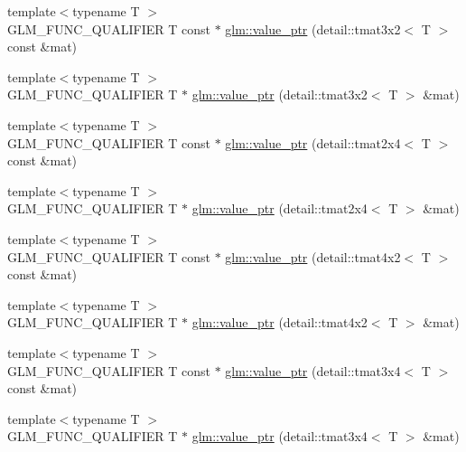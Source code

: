 \begin{DoxyCompactItemize}
\item 
{\footnotesize template$<$typename T $>$ }\\\-G\-L\-M\-\_\-\-F\-U\-N\-C\-\_\-\-Q\-U\-A\-L\-I\-F\-I\-E\-R \-T const $\ast$ \hyperlink{group__gtc__type__ptr_gad58ae53d7a86bf7caadd7f1be2db3f1a}{glm\-::value\-\_\-ptr} (detail\-::tmat3x2$<$ \-T $>$ const \&mat)
\item 
{\footnotesize template$<$typename T $>$ }\\\-G\-L\-M\-\_\-\-F\-U\-N\-C\-\_\-\-Q\-U\-A\-L\-I\-F\-I\-E\-R \-T $\ast$ \hyperlink{group__gtc__type__ptr_ga241b3c1e7e747ab934e2c38679fe90a5}{glm\-::value\-\_\-ptr} (detail\-::tmat3x2$<$ \-T $>$ \&mat)
\item 
{\footnotesize template$<$typename T $>$ }\\\-G\-L\-M\-\_\-\-F\-U\-N\-C\-\_\-\-Q\-U\-A\-L\-I\-F\-I\-E\-R \-T const $\ast$ \hyperlink{group__gtc__type__ptr_ga6b5545ede3accc40f90aa05014406bcf}{glm\-::value\-\_\-ptr} (detail\-::tmat2x4$<$ \-T $>$ const \&mat)
\item 
{\footnotesize template$<$typename T $>$ }\\\-G\-L\-M\-\_\-\-F\-U\-N\-C\-\_\-\-Q\-U\-A\-L\-I\-F\-I\-E\-R \-T $\ast$ \hyperlink{group__gtc__type__ptr_gad3ffa3b03348e1c71b509023d0e48436}{glm\-::value\-\_\-ptr} (detail\-::tmat2x4$<$ \-T $>$ \&mat)
\item 
{\footnotesize template$<$typename T $>$ }\\\-G\-L\-M\-\_\-\-F\-U\-N\-C\-\_\-\-Q\-U\-A\-L\-I\-F\-I\-E\-R \-T const $\ast$ \hyperlink{group__gtc__type__ptr_ga8278dac512c3e2c638b6713d63c728bb}{glm\-::value\-\_\-ptr} (detail\-::tmat4x2$<$ \-T $>$ const \&mat)
\item 
{\footnotesize template$<$typename T $>$ }\\\-G\-L\-M\-\_\-\-F\-U\-N\-C\-\_\-\-Q\-U\-A\-L\-I\-F\-I\-E\-R \-T $\ast$ \hyperlink{group__gtc__type__ptr_gab70c3bd4e9be92b0c9b9668744f0b5c8}{glm\-::value\-\_\-ptr} (detail\-::tmat4x2$<$ \-T $>$ \&mat)
\item 
{\footnotesize template$<$typename T $>$ }\\\-G\-L\-M\-\_\-\-F\-U\-N\-C\-\_\-\-Q\-U\-A\-L\-I\-F\-I\-E\-R \-T const $\ast$ \hyperlink{group__gtc__type__ptr_gaa38c5a2be6c64a69e7e5d64b70137e1c}{glm\-::value\-\_\-ptr} (detail\-::tmat3x4$<$ \-T $>$ const \&mat)
\item 
{\footnotesize template$<$typename T $>$ }\\\-G\-L\-M\-\_\-\-F\-U\-N\-C\-\_\-\-Q\-U\-A\-L\-I\-F\-I\-E\-R \-T $\ast$ \hyperlink{group__gtc__type__ptr_ga7a9cf1d2fb02f56ba01e27ad528aac7d}{glm\-::value\-\_\-ptr} (detail\-::tmat3x4$<$ \-T $>$ \&mat)

\end{DoxyCompactItemize}
